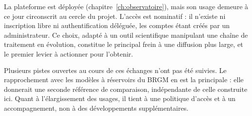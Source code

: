 La plateforme est déployée (chapitre~\ref{ch:observatoire}), mais son usage demeure à ce jour
circonscrit au cercle du projet. L'accès est nominatif : il n'existe ni inscription libre ni
authentification déléguée, les comptes étant créés par un administrateur. Ce choix, adapté à un
outil scientifique manipulant une chaîne de traitement en évolution, constitue le principal frein
à une diffusion plus large, et le premier levier à actionner pour l'obtenir.

Plusieurs pistes ouvertes au cours de ces échanges n'ont pas été suivies. Le rapprochement avec
les modèles à réservoirs du BRGM en est la principale : elle donnerait une seconde référence de
comparaison, indépendante de celle construite ici. Quant à l'élargissement des usages, il tient à
une politique d'accès et à un accompagnement, non à des développements supplémentaires.
